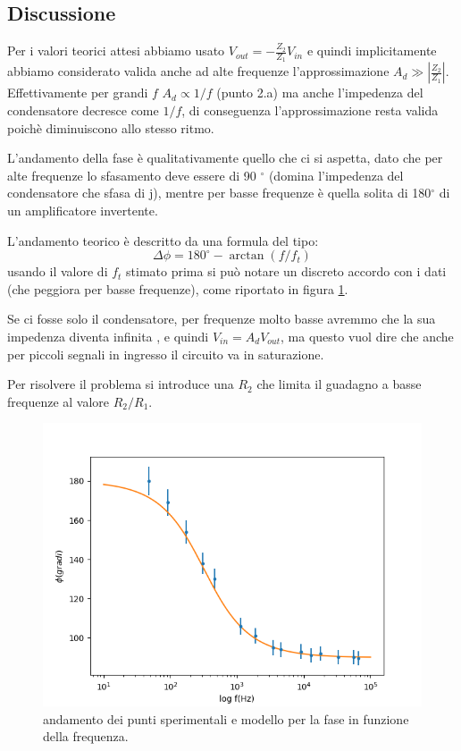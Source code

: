 \documentclass[10pt,a4paper]{article}
\begin{document}
\clearpage
	\subsection{Discussione}	
	
	

	
 Per i valori teorici attesi abbiamo usato $V_{out}= -\frac{Z_2}{Z_1} V_{in}$ e quindi implicitamente abbiamo considerato valida anche ad alte  frequenze l'approssimazione $A_d \gg |\frac{Z_2}{Z_1}|$. Effettivamente per grandi $f$  $A_d\propto 1/f$ (punto 2.a) ma anche l'impedenza del condensatore decresce come $1/f$, di conseguenza l'approssimazione resta valida poichè diminuiscono allo stesso ritmo.

L'andamento della fase  è qualitativamente quello che ci si aspetta, dato che per alte frequenze lo sfasamento deve essere di 90 $^{\circ}$ (domina l'impedenza del condensatore che sfasa di j), mentre per basse frequenze è quella solita di 180$^{\circ}$ di un amplificatore invertente.

 L'andamento teorico è descritto da una formula del tipo:\[\Delta\phi=180^{\circ}-\arctan(f/f_t)\]  usando il valore di $f_t$ stimato prima si può notare un discreto accordo con i dati (che peggiora per basse frequenze), come riportato in figura \ref{esempio}.


Se ci fosse solo il condensatore, per  frequenze molto basse avremmo che la sua impedenza diventa infinita , e quindi  $V_{in} = A_dV_{out}$, ma questo vuol dire che anche per piccoli segnali in ingresso il circuito va in saturazione.

Per risolvere il problema si introduce  una $R_2 $ che limita il guadagno a basse frequenze al valore $R_2/R_1$.

\begin{figure}
 \begin{center}
		
	\includegraphics[scale=0.5]{faseint.png}
\caption{\small andamento dei punti sperimentali e modello per la fase in funzione della frequenza.}
	
	\label{esempio}
	\end{center}
\end{figure}
	


	\begin{tabular}{cc}

\end{tabular}
\end{document}
